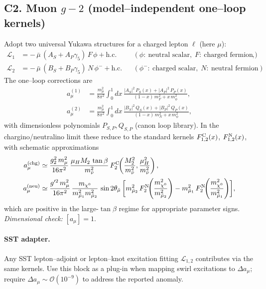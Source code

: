\documentclass[11pt]{article}
\begin{document}
      \subsection*{C2. Muon $g-2$ (model--independent one--loop kernels)}
          Adopt two universal Yukawa structures for a charged lepton $\ell$ (here $\mu$):
          \begin{align}
          \mathcal L_1 &= -\,\bar\mu\,(A_S + A_P\gamma_5)\,F\,\phi + \text{h.c.}
          && (\phi:\ \text{neutral scalar},\; F:\ \text{charged fermion}),\\
          \mathcal L_2 &= -\,\bar\mu\,(B_S + B_P\gamma_5)\,N\,\phi^- + \text{h.c.}
          && (\phi^-:\ \text{charged scalar},\; N:\ \text{neutral fermion}).
          \end{align}
          The one--loop corrections are
          \begin{align}
          a_\mu^{(1)} &= \frac{m_\mu^2}{8\pi^2}\!\int_0^1\!dx\,
          \frac{|A_S|^2\,P_S(x)+|A_P|^2\,P_P(x)}{(1-x)\,m_F^2 + x\,m_\phi^2},\\[2pt]
          a_\mu^{(2)} &= \frac{m_\mu^2}{8\pi^2}\!\int_0^1\!dx\,
          \frac{|B_S|^2\,Q_S(x)+|B_P|^2\,Q_P(x)}{(1-x)\,m_N^2 + x\,m_\phi^2},
          \end{align}
          with dimensionless polynomials $P_{S,P},Q_{S,P}$ (canon loop library). In the chargino/neutralino limit these reduce to the standard kernels $F^{\rm C}_{1,2}(x)$, $F^{\rm N}_{1,2}(x)$, with schematic approximations
          \begin{align}
          a_\mu^{\rm (chg)} &\simeq
          \frac{g_2^2\,m_\mu^2}{16\pi^2}\,
          \frac{\mu_H M_2\,\tan\beta}{m_{\tilde\nu}^2}\,
          F^{\rm C}_2\!\!\left(\frac{M_2^2}{m_{\tilde\nu}^2},\frac{\mu_H^2}{m_{\tilde\nu}^2}\right),\\[2pt]
          a_\mu^{\rm (neu)} &\simeq
          \frac{g'^2\,m_\mu^2}{16\pi^2}\,
          \frac{m_{\chi^0}}{m_{\tilde\mu_1}^2 m_{\tilde\mu_2}^2}\,
          \sin 2\theta_{\tilde\mu}\,
          \biggl[
              m_{\tilde\mu_2}^2\,F^{\rm N}_2\!\!\left(\frac{m_{\chi^0}^2}{m_{\tilde\mu_2}^2}\right)
              - m_{\tilde\mu_1}^2\,F^{\rm N}_2\!\!\left(\frac{m_{\chi^0}^2}{m_{\tilde\mu_1}^2}\right)
              \biggr],
          \end{align}
          which are positive in the large-$\tan\beta$ regime for appropriate parameter signs. \textit{Dimensional check:} $[a_\mu]=1$.

          \paragraph{SST adapter.} Any SST lepton–adjoint or lepton–knot excitation fitting $\mathcal L_{1,2}$ contributes via the same kernels. Use this block as a plug-in when mapping swirl excitations to $\Delta a_\mu$; require $\Delta a_\mu\sim\mathcal O(10^{-9})$ to address the reported anomaly.
\end{document}
